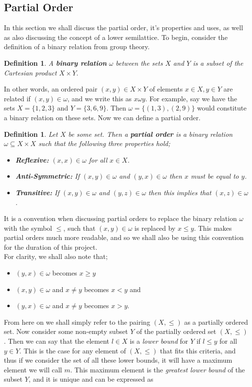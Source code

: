 \documentclass[12pt]{article}
\newtheorem{defn}[theorem]{Definition}
\begin{document}
\subsection{Partial Order}
In this section we shall discuss the partial order, it's properties and uses, as well as also discussing the concept of a lower semilattice. To begin, consider the definition of a binary relation from group theory.
\begin{defn}
	A \textbf{binary relation} $\omega$ between the sets $X$ and $Y$ is a subset of the Cartesian product $X \times Y$.
\end{defn}
\noindent In other words, an ordered pair $(x,y) \in X \times Y$ of elements $x \in X, y \in Y$ are related if $(x,y) \in \omega$, and we write this as $x \omega y$. For example, say we have the sets $X = \{1,2,3\}$ and $Y = \{3,6,9\}$. Then $\omega = \{(1,3), (2,9)\}$ would constitute a binary relation on these sets. Now we can define a partial order.
\begin{defn}\label{partial}
	Let $X$ be some set. Then a \textbf{partial order} is a binary relation $\omega \subseteq X \times X$ such that the following three properties hold;
	\begin{itemize}
		\item[] \textbf{Reflexive:} $(x,x) \in \omega$ for all $x \in X$.
		\item[] \textbf{Anti-Symmetric:} If $(x,y) \in \omega$ and $(y,x) \in \omega$ then $x$ must be equal to $y$.
		\item[] \textbf{Transitive:} If $(x,y) \in \omega$ and $(y,z) \in \omega$ then this implies that $(x,z) \in \omega$.
	\end{itemize}
\end{defn}
\noindent It is a convention when discussing partial orders to replace the binary relation $\omega$ with the symbol $\leq$, such that $(x,y) \in \omega$ is replaced by $x \leq y$. This makes partial orders much more readable, and so we shall also be using this convention for the duration of this project. 
\\For clarity, we shall also note that;
\begin{itemize}
	\item[$\bullet$] $(y,x)\in \omega$ becomes $x \geq y$
	\item[$\bullet$] $(x,y) \in \omega$ and $ x \neq y$ becomes $x < y$ and
	\item[$\bullet$] $(y,x) \in \omega$ and $x \neq y$ becomes $x>y$.
\end{itemize}
From here on we shall simply refer to the pairing $(X, \leq)$ as a partially ordered set. Now consider some non-empty subset $Y$ of the partially ordered set $(X, \leq)$. Then we can say that the element $l \in X$ is a \textit{lower bound} for $Y$ if $l \leq y$ for all $y \in Y$. This is the case for any element of $(X,\leq)$ that fits this criteria, and thus if we consider the set of all these lower bounds, it will have a maximum element we will call $m$. This maximum element is the \textit{greatest lower bound} of the subset $Y$, and it is unique and can be expressed as
\end{document}
